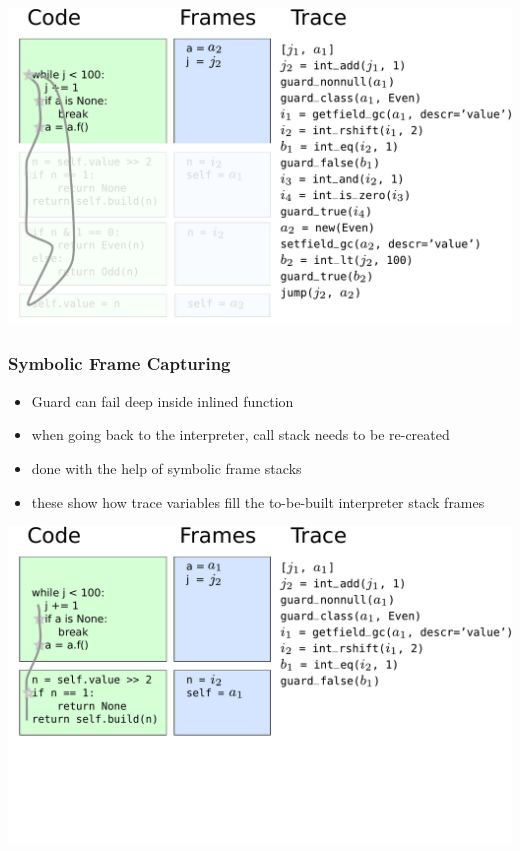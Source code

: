 \documentclass[utf8x]{beamer}
\begin{document}
\begin{frame}
  \includegraphics[scale=0.4]{figures/loop12}
\end{frame}



\begin{frame}
  \frametitle{Symbolic Frame Capturing}
  \begin{itemize}
      \item Guard can fail deep inside inlined function
      \item when going back to the interpreter, call stack needs to be re-created
      \item done with the help of symbolic frame stacks
      \item these show how trace variables fill the to-be-built interpreter stack frames
  \end{itemize}
\end{frame}

\begin{frame}
  \includegraphics[scale=0.4]{figures/loop07}
\end{frame}
\end{document}
